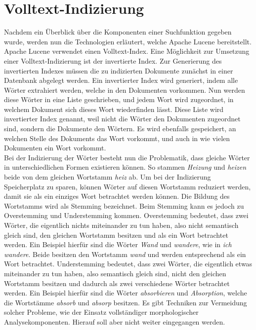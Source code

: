 \section{Volltext-Indizierung}
\label{chap:volltext-indizierung}
Nachdem ein Überblick über die Komponenten einer Suchfunktion gegeben wurde, werden nun die Technologien erläutert, welche Apache Lucene bereitstellt.
Apache Lucene verwendet einen Volltext-Index.
Eine Möglichkeit zur Umsetzung einer Volltext-Indizierung ist der invertierte Index.
Zur Generierung des invertierten Indexes müssen die zu indizierten Dokumente zunächst in einer Datenbank abgelegt werden.
Ein invertierter Index wird generiert, indem alle Wörter extrahiert werden, welche in den Dokumenten vorkommen.
Nun werden diese Wörter in eine Liste geschrieben, und jedem Wort wird zugeordnet, in welchem Dokument sich dieses Wort wiederfinden lässt.
Diese Liste wird invertierter Index genannt, weil nicht die Wörter den Dokumenten zugeordnet sind, sondern die Dokumente den Wörtern.
Es wird ebenfalls gespeichert, an welchen Stelle des Dokuments das Wort vorkommt, und auch in wie vielen Dokumenten ein Wort vorkommt.\\

Bei der Indizierung der Wörter besteht nun die Problematik, dass gleiche Wörter in unterschiedlichen Formen existieren können.
So stammen \textit{Heizung} und \textit{heizen} beide von dem gleichen Wortstamm \textit{heiz} ab.
Um bei der Indizierung Speicherplatz zu sparen, können Wörter auf diesen Wortstamm reduziert werden, damit sie als ein einziges Wort betrachtet werden können.
Die Bildung des Wortstamms wird als Stemming bezeichnet.
Beim Stemming kann es jedoch zu Overstemming und Understemming kommen.
Overstemming bedeutet, dass zwei Wörter, die eigentlich nichts miteinander zu tun haben, also nicht semantisch gleich sind, den gleichen Wortstamm besitzen und als ein Wort betrachtet werden.
Ein Beispiel hierfür sind die Wörter \textit{Wand} und \textit{wandere}, wie in \textit{ich wandere}.
Beide besitzen den Wortstamm \textit{wand} und werden entsprechend als ein Wort betrachtet.
Understemming bedeutet, dass zwei Wörter, die eigentlich etwas miteinander zu tun haben, also semantisch gleich sind, nicht den gleichen Wortstamm besitzen und dadurch als zwei verschiedene Wörter betrachtet werden.
Ein Beispiel hierfür sind die Wörter \textit{absorbieren} und \textit{Absorption}, welche die Wortstämme \textit{absorb} und \textit{absorp} besitzen.
Es gibt Techniken zur Vermeidung solcher Probleme, wie der Einsatz vollständiger morphologischer Analysekomponenten.
Hierauf soll aber nicht weiter eingegangen werden.\\

